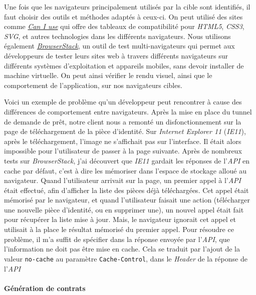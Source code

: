 Une fois que les navigateurs principalement utilisés par la cible sont
identifiés, il faut choisir des outils et méthodes adaptés à ceux-ci. On
peut utilisé des sites comme \href{http://caniuse.com/}{\emph{Can I
use}} qui offre des tableaux de compatibilité pour \emph{HTML5},
\emph{CSS3}, \emph{SVG}, et autres technologies dans les différents
navigateurs. Nous utilisons également
\href{https://www.browserstack.com/}{\emph{BrowserStack}}, un outil de
test multi-navigateurs qui permet aux développeurs de tester leurs sites
web à travers différents navigateurs sur différents systèmes
d'exploitation et appareils mobiles, sans devoir installer de machine
virtuelle. On peut ainsi vérifier le rendu visuel, ainsi que le
comportement de l'application, sur nos navigateurs cibles.

\bigskip

Voici un exemple de problème qu'un développeur peut rencontrer à cause
des différences de comportement entre navigateurs. Après la mise en
place du tunnel de demande de prêt, notre client nous a remonté un
disfonctionnement sur la page de téléchargement de la pièce d'identité.
Sur \emph{Internet Explorer 11} (\emph{IE11}), après le téléchargement,
l'image ne s'affichait pas sur l'interface. Il était alors impossible
pour l'utilisateur de passer à la page suivante. Après de nombreux tests
sur \emph{BrowserStack}, j'ai découvert que \emph{IE11} gardait les
réponses de l'\emph{API} en cache par défaut, c'est à dire les mémoriser
dans l'espace de stockage alloué au navigateur. Quand l'utilisateur
arrivait sur la page, un premier appel à l'\emph{API} était effectué,
afin d'afficher la liste des pièces déjà téléchargées. Cet appel était
mémorisé par le navigateur, et quand l'utilisateur faisait une action
(télécharger une nouvelle pièce d'identité, ou en supprimer une), un
nouvel appel était fait pour récupérer la liste mise à jour. Mais, le
navigateur ignorait cet appel et utilisait à la place le résultat
mémorisé du premier appel. Pour résoudre ce problème, il m'a suffit de
spécifier dans la réponse envoyée par l'\emph{API}, que l'information ne
doit pas être mise en cache. Cela se traduit par l'ajout de la valeur
\texttt{no-cache} au paramètre \texttt{Cache-Control}, dans le
\emph{Header} de la réponse de l'\emph{API}

\bigskip

\paragraph{Génération de contrats}\label{guxe9nuxe9ration-de-contrats}

